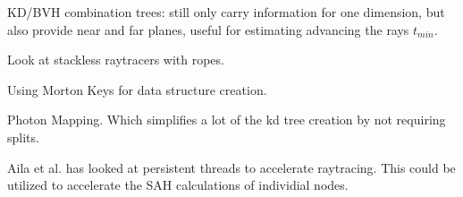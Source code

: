 
KD/BVH combination trees: still only carry information for one
dimension, but also provide near and far planes, useful for estimating
advancing the rays $t_{min}$.

Look at stackless raytracers with ropes.

Using Morton Keys for data structure creation.

Photon Mapping. Which simplifies a lot of the kd tree creation by not
requiring splits.

Aila et al. has looked at persistent threads to
accelerate raytracing. This could be utilized to accelerate the SAH
calculations of individial nodes.

